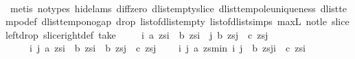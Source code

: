 \begin{isabellebody}
\ \ \ \ \isamarkupfalse%
\ {}\isanewline
\ \ \ \ \isamarkupfalse%
\ {\isacharparenleft}metis\ {\isacharparenleft}no{\isacharunderscore}types{\isacharcomma}\ hide{\isacharunderscore}lams{\isacharparenright}\ diff{\isacharunderscore}zero\ dlist{\isacharunderscore}empty{\isacharunderscore}slice\ dlist{\isacharunderscore}tempo{}{\isacharunderscore}le{\isacharunderscore}uniqueness\ dlist{\isacharunderscore}tempo{}{\isacharunderscore}def\ dlist{\isacharunderscore}tempo{\isacharunderscore}{}{\isacharunderscore}no{\isacharunderscore}gap\ drop{\isacharunderscore}{}\ list{\isacharunderscore}of{\isacharunderscore}dlist{\isacharunderscore}empty\ list{\isacharunderscore}of{\isacharunderscore}dlist{\isacharunderscore}simps{\isacharparenleft}{}{\isacharparenright}\ max{\isacharunderscore}{}L\ not{\isacharunderscore}le\ slice{\isacharunderscore}left{\isacharunderscore}drop\ slice{\isacharunderscore}right{\isacharunderscore}def\ take{\isacharunderscore}{}{\isacharparenright}\isanewline
\ \ \isamarkupfalse%
\ {}{\isacharcolon}\ {\isachardoublequoteopen}{\isacharparenleft}{\isacharparenleft}{\isasymexists}i{\isachardot}\ a\ {\isacharparenleft}zs{\isasymdagger}{\isachardot}{\isachardot}i{\isacharparenright}\ {\isasymand}\ b\ {\isacharparenleft}zs{\isasymdagger}i{\isachardot}{\isachardot}{\isacharparenright}{\isacharparenright}\ {\isasymand}\ {\isacharparenleft}{\isasymexists}j{\isachardot}\ b\ {\isacharparenleft}zs{\isasymdagger}{\isachardot}{\isachardot}j{\isacharparenright}\ {\isasymand}\ c\ {\isacharparenleft}zs{\isasymdagger}j{\isachardot}{\isachardot}{\isacharparenright}{\isacharparenright}{\isacharparenright}\ {\isasymlongleftrightarrow}\ \isanewline
\ \ \ \ {\isacharparenleft}{\isasymexists}\ i\ j{\isachardot}\ a\ {\isacharparenleft}zs{\isasymdagger}{\isachardot}{\isachardot}i{\isacharparenright}\ {\isasymand}\ b\ {\isacharparenleft}zs{\isasymdagger}i{\isachardot}{\isachardot}{\isacharparenright}\ {\isasymand}\ b\ {\isacharparenleft}zs{\isasymdagger}{\isachardot}{\isachardot}j{\isacharparenright}\ {\isasymand}\ c\ {\isacharparenleft}zs{\isasymdagger}j{\isachardot}{\isachardot}{\isacharparenright}{\isacharparenright}{\isachardoublequoteclose}\isanewline
\ \ \ \ {\isachardoublequoteopen}{\isacharparenleft}{\isasymexists}i{\isachardot}\ {\isacharparenleft}{\isasymexists}j{\isachardot}\ a\ {\isacharparenleft}zs{\isasymdagger}{\isachardot}{\isachardot}min\ i\ j{\isacharparenright}\ {\isasymand}\ b\ {\isacharparenleft}zs{\isasymdagger}j{\isachardot}{\isachardot}i{\isacharparenright}{\isacharparenright}\ {\isasymand}\ c\ {\isacharparenleft}zs{\isasymdagger}i{\isachardot}{\isachardot}{\isacharparenright}{\isacharparenright}\ {\isasymlongleftrightarrow}\ \isanewline

\end{isabellebody}
